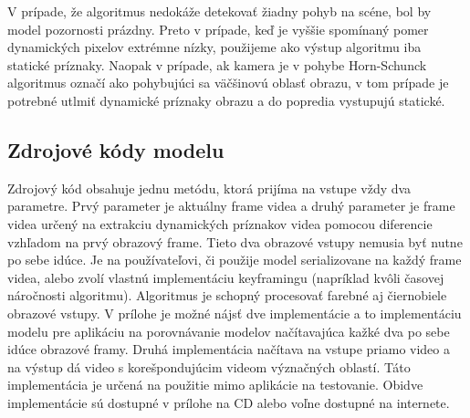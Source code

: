 V prípade, že algoritmus nedokáže detekovať žiadny pohyb na scéne, bol by model pozornosti prázdny.
Preto v prípade, keď je vyššie spomínaný pomer dynamických pixelov extrémne nízky, použijeme ako výstup algoritmu iba statické príznaky.
Naopak v prípade, ak kamera je v pohybe Horn-Schunck algoritmus označí ako pohybujúci sa väčšinovú oblasť obrazu, v tom prípade je potrebné utlmiť dynamické príznaky obrazu a do popredia vystupujú statické.

\subsection{Zdrojové kódy modelu}
Zdrojový kód obsahuje jednu metódu, ktorá prijíma na vstupe vždy dva parametre.
Prvý parameter je aktuálny frame videa a druhý parameter je frame videa určený na extrakciu dynamických príznakov videa pomocou diferencie vzhľadom na prvý obrazový frame.
Tieto dva obrazové vstupy nemusia byť nutne po sebe idúce.
Je na používateľovi, či použije model serializovane na každý frame videa, alebo zvolí vlastnú implementáciu keyframingu (napríklad kvôli časovej náročnosti algoritmu).
Algoritmus je schopný procesovať farebné aj čiernobiele obrazové vstupy.
V prílohe je možné nájsť dve implementácie a to implementáciu modelu pre aplikáciu na porovnávanie modelov načítavajúca kažké dva po sebe idúce obrazové framy.
Druhá implementácia načítava na vstupe priamo video a na výstup dá video s korešpondujúcim videom význačných oblastí.
Táto implementácia je určená na použitie mimo aplikácie na testovanie.
Obidve implementácie sú dostupné v prílohe na CD alebo voľne dostupné na internete.

